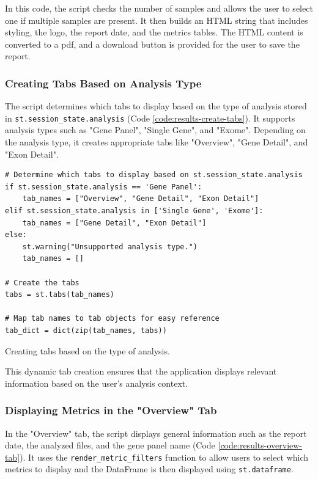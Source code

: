 In this code, the script checks the number of samples and allows the user to select one if multiple samples are present. It then builds an HTML string that includes styling, the logo, the report date, and the metrics tables. The HTML content is converted to a \ac{pdf}, and a download button is provided for the user to save the report.

\subsubsection{\textbf{Creating Tabs Based on Analysis Type}}

The script determines which tabs to display based on the type of analysis stored in \texttt{st.session\_state.analysis} (Code \ref{code:results-create-tabs}). It supports analysis types such as "Gene Panel", "Single Gene", and "Exome". Depending on the analysis type, it creates appropriate tabs like "Overview", "Gene Detail", and "Exon Detail".

\begin{longlisting}
\begin{verbatim}
# Determine which tabs to display based on st.session_state.analysis
if st.session_state.analysis == 'Gene Panel':
    tab_names = ["Overview", "Gene Detail", "Exon Detail"]
elif st.session_state.analysis in ['Single Gene', 'Exome']:
    tab_names = ["Gene Detail", "Exon Detail"]
else:
    st.warning("Unsupported analysis type.")
    tab_names = []

# Create the tabs
tabs = st.tabs(tab_names)

# Map tab names to tab objects for easy reference
tab_dict = dict(zip(tab_names, tabs))
\end{verbatim}
\caption{Creating tabs based on the type of analysis.}
\label{code:results-create-tabs}
\end{longlisting}

This dynamic tab creation ensures that the application displays relevant information based on the user's analysis context.

\subsubsection{\textbf{Displaying Metrics in the "Overview" Tab}}

In the "Overview" tab, the script displays general information such as the report date, the analyzed files, and the gene panel name (Code \ref{code:results-overview-tab}). It uses the \texttt{render\_metric\_filters} function to allow users to select which metrics to display and the DataFrame is then displayed using \texttt{st.dataframe}.

